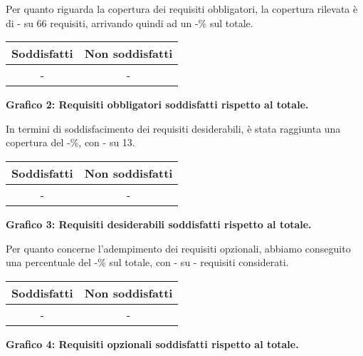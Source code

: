 Per quanto riguarda la copertura dei requisiti obbligatori, la copertura rilevata è di - su 66 requisiti, arrivando quindi ad un -\% sul totale.
\begin{center}
\begin{tabular}{|c|c|}
\hline
\textbf{Soddisfatti} & \textbf{Non soddisfatti} \\
\hline
- & - \\
\hline
\end{tabular}
\end{center}
\begin{center}
\textbf{Grafico 2: Requisiti obbligatori soddisfatti rispetto al totale.}
\end{center}

In termini di soddisfacimento dei requisiti desiderabili, è stata raggiunta una copertura del -\%, con - su 13.
\begin{center}
\begin{tabular}{|c|c|}
\hline
\textbf{Soddisfatti} & \textbf{Non soddisfatti} \\
\hline
- & - \\
\hline
\end{tabular}
\end{center}
\begin{center}
\textbf{Grafico 3: Requisiti desiderabili soddisfatti rispetto al totale.}
\end{center}
Per quanto concerne l’adempimento dei requisiti opzionali, abbiamo conseguito una percentuale del -\% sul totale, con - su - requisiti considerati.
\begin{center}
    \begin{tabular}{|c|c|}
    \hline
    \textbf{Soddisfatti} & \textbf{Non soddisfatti} \\
    \hline
    - & - \\
    \hline
    \end{tabular}
    \end{center}
    \begin{center}
    \textbf{Grafico 4: Requisiti opzionali soddisfatti rispetto al totale.}
    \end{center}